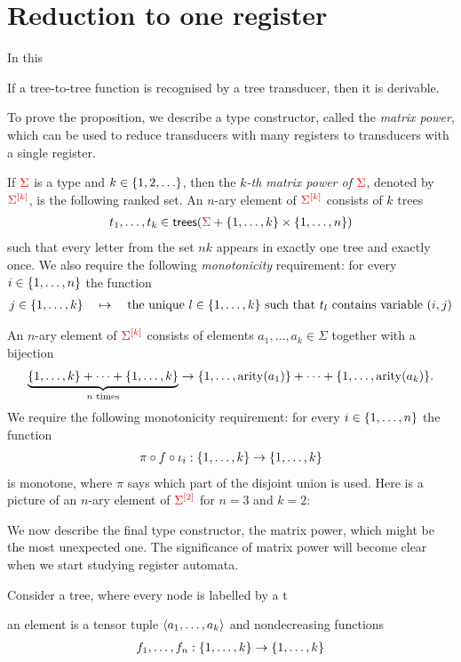 \section{Reduction to one register}
\label{sec:matrix-power}
In this 
\begin{proposition}
    \label{prop:many-register} 
    If a  tree-to-tree function is recognised by a tree transducer, then it is derivable. 
\end{proposition}


To prove the proposition, we describe a type constructor, called the \emph{matrix power}, which can be used to reduce transducers with many registers to transducers with a single register. 
\begin{definition}
    If  ${\color{red}{\Sigma}}$ is a type and $k \in \{1,2,\ldots\}$, then the \emph{$k$-th matrix power of ${\color{red}{\Sigma}}$}, denoted by ${\color{red}{\Sigma^{[k]}}}$, is the following ranked set. An $n$-ary element of ${\color{red}{\Sigma^{[k]}}}$ consists of $k$ trees 
\begin{align*}
    t_1,\ldots,t_k \in \mathsf {trees} ({\color{red}{\Sigma}} + \{1,\ldots,k\} \times \{1,\ldots,n\})
\end{align*}
such that every letter from the set $nk$ appears in exactly one tree and exactly once. We also require the following \emph{monotonicity} requirement: for every $i \in \{1,\ldots,n\}$ the function
\begin{align}
    j \in \{1,\ldots,k\} \quad \mapsto \quad \text{the unique $l \in \{1,\ldots,k\}$ such that $t_l$ contains variable $(i,j)$}
\end{align}
    
    
    An  $n$-ary element of ${\color{red}{\Sigma^{[k]}}}$ consists of elements $a_1,\ldots,a_k \in \Sigma$ together with  a bijection 
    \begin{align*}
        \underbrace{\{1,\ldots,k\} + \cdots + \{1,\ldots,k\}}_{\text{$n$ times}} \to        \{1,\ldots,\mathrm{arity}(a_1)\} + \cdots + \{1,\ldots,\mathrm{arity}(a_k)\}. 
    \end{align*}
    We require the following monotonicity requirement: for every $i \in \{1,\ldots,n\}$ the function
    \begin{align*}
\pi \circ  f \circ \iota_i : \{1,\ldots,k\}  \to   \{1,\ldots,k\}
    \end{align*}
    is monotone, where $\pi$ says which part of the disjoint union is used. 
    Here is a picture of an $n$-ary element of  ${\color{red}{\Sigma^{[2]}}}$ for $n=3$ and $k=2$:
\end{definition}
  
We now describe the final type constructor, the matrix power, which might be the most unexpected one. The significance of matrix power will become clear when we start studying register automata.  

Consider a tree, where every node is labelled by a t

an element is a tensor tuple $\langle{a_1,\ldots,a_k}\rangle$ and nondecreasing functions 
\begin{align*}
    f_1,\ldots,f_n : \{1,\ldots,k\} \to \{1,\ldots,k\}
\end{align*}

